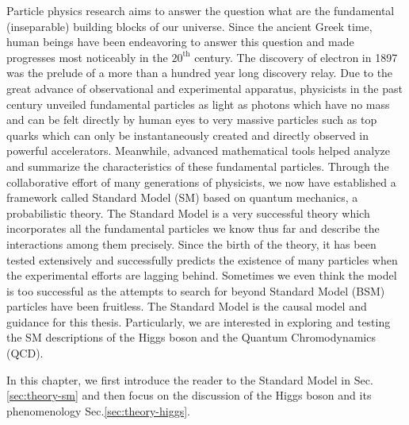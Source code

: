 Particle physics research aims to answer the question what are the fundamental (inseparable) building blocks of our universe. Since the ancient Greek time, human beings have been endeavoring to answer this question and made progresses most noticeably in the $20^{\text{th}}$ century. The discovery of electron in 1897 was the prelude of a more than a hundred year long discovery relay. Due to the great advance of observational and experimental apparatus, physicists in the past century unveiled fundamental particles as light as photons which have no mass and can be felt directly by human eyes to very massive particles such as top quarks which can only be instantaneously created and directly observed in powerful accelerators. Meanwhile, advanced mathematical tools helped analyze and summarize the characteristics of these fundamental particles. Through the collaborative effort of many generations of physicists, we now have established a framework called Standard Model (SM) based on quantum mechanics, a probabilistic theory. The Standard Model is a very successful theory which incorporates all the fundamental particles we know thus far and describe the interactions among them precisely. Since the birth of the theory, it has been tested extensively and successfully predicts the existence of many particles when the experimental efforts are lagging behind. Sometimes we even think the model is too successful as the attempts to search for beyond Standard Model (BSM) particles have been fruitless. The Standard Model is the causal model and guidance for this thesis. Particularly, we are interested in exploring and testing the SM descriptions of the Higgs boson and the Quantum Chromodynamics (QCD).

In this chapter, we first introduce the reader to the Standard Model in Sec.\ref{sec:theory-sm} and then focus on the discussion of the Higgs boson and its phenomenology Sec.\ref{sec:theory-higgs}.
